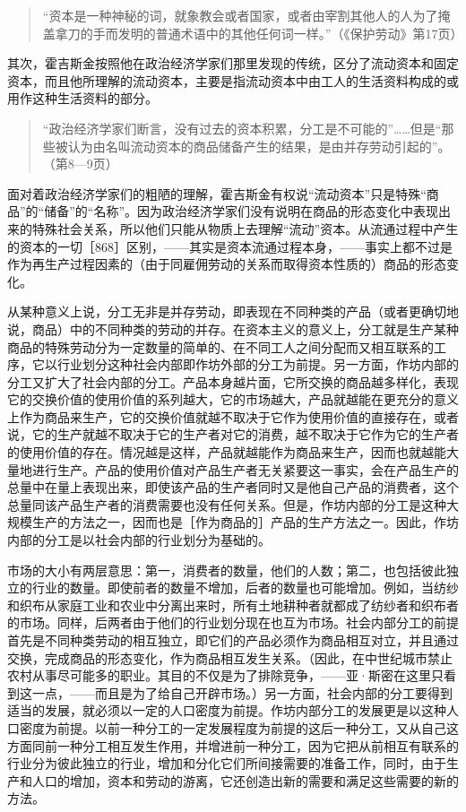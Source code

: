 \begin{quote}{“资本是一种神秘的词，就象教会或者国家，或者由宰割其他人的人为了掩盖拿刀的手而发明的普通术语中的其他任何词一样。”（《保护劳动》第17页）}\end{quote}

其次，霍吉斯金按照他在政治经济学家们那里发现的传统，区分了流动资本和固定资本，而且他所理解的流动资本，主要是指流动资本中由工人的生活资料构成的或用作这种生活资料的部分。

\begin{quote}{“政治经济学家们断言，没有过去的资本积累，分工是不可能的”……但是“那些被认为由名叫流动资本的商品储备产生的结果，是由并存劳动引起的”。（第8—9页）}\end{quote}

面对着政治经济学家们的粗陋的理解，霍吉斯金有权说“流动资本”只是特殊“商品”的“储备”的“名称”。因为政治经济学家们没有说明在商品的形态变化中表现出来的特殊社会关系，所以他们只能从物质上去理解“流动”资本。从流通过程中产生的资本的一切［868］区别，——其实是资本流通过程本身，——事实上都不过是作为再生产过程因素的（由于同雇佣劳动的关系而取得资本性质的）商品的形态变化。

从某种意义上说，分工无非是并存劳动，即表现在不同种类的产品（或者更确切地说，商品）中的不同种类的劳动的并存。在资本主义的意义上，分工就是生产某种商品的特殊劳动分为一定数量的简单的、在不同工人之间分配而又相互联系的工序，它以行业划分这种社会内部即作坊外部的分工为前提。另一方面，作坊内部的分工又扩大了社会内部的分工。产品本身越片面，它所交换的商品越多样化，表现它的交换价值的使用价值的系列越大，它的市场越大，产品就越能在更充分的意义上作为商品来生产，它的交换价值就越不取决于它作为使用价值的直接存在，或者说，它的生产就越不取决于它的生产者对它的消费，越不取决于它作为它的生产者的使用价值的存在。情况越是这样，产品就越能作为商品来生产，因而也就越能大量地进行生产。产品的使用价值对产品生产者无关紧要这一事实，会在产品生产的总量中在量上表现出来，即使该产品的生产者同时又是他自己产品的消费者，这个总量同该产品生产者的消费需要也没有任何关系。但是，作坊内部的分工是这种大规模生产的方法之一，因而也是［作为商品的］产品的生产方法之一。因此，作坊内部的分工是以社会内部的行业划分为基础的。

市场的大小有两层意思：第一，消费者的数量，他们的人数；第二，也包括彼此独立的行业的数量。即使前者的数量不增加，后者的数量也可能增加。例如，当纺纱和织布从家庭工业和农业中分离出来时，所有土地耕种者就都成了纺纱者和织布者的市场。同样，后两者由于他们的行业划分现在也互为市场。社会内部分工的前提首先是不同种类劳动的相互独立，即它们的产品必须作为商品相互对立，并且通过交换，完成商品的形态变化，作为商品相互发生关系。（因此，在中世纪城市禁止农村从事尽可能多的职业。其目的不仅是为了排除竞争，——亚·斯密在这里只看到这一点，——而且是为了给自己开辟市场。）另一方面，社会内部的分工要得到适当的发展，就必须以一定的人口密度为前提。作坊内部分工的发展更是以这种人口密度为前提。以前一种分工的一定发展程度为前提的这后一种分工，又从自己这方面同前一种分工相互发生作用，并增进前一种分工，因为它把从前相互有联系的行业分为彼此独立的行业，增加和分化它们所间接需要的准备工作，同时，由于生产和人口的增加，资本和劳动的游离，它还创造出新的需要和满足这些需要的新的方法。

